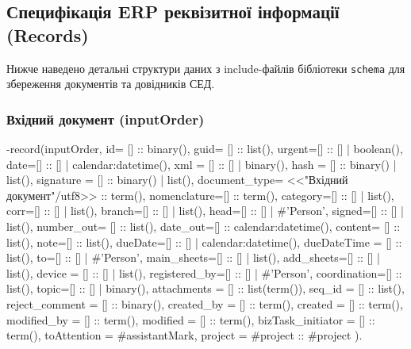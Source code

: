 \documentclass{article}
\let\originalfootnotesize\footnotesize
\let\oldverbatim\verbatim
\let\oldendverbatim\endverbatim
\renewenvironment{verbatim}{\originalfootnotesize\oldverbatim}{\oldendverbatim}
\begin{document}
\subsection{Специфікація ERP реквізитної інформації (Records)}

Нижче наведено детальні структури даних з include-файлів бібліотеки \texttt{schema} для збереження документів та довідників СЕД.

\subsubsection{Вхідний документ (inputOrder)}
\begin{verbatim}
-record(inputOrder, { id= [] :: binary(),
                      guid= [] :: list(),
                      urgent=[] :: [] | boolean(),
                      date=[] :: [] | calendar:datetime(),
                      xml = [] :: [] | binary(),
                      hash = [] :: binary() | list(),
                      signature = [] :: binary() | list(),
                      document_type= <<"Вхідний документ"/utf8>> :: term(),
                      nomenclature=[] :: term(),
                      category=[] :: [] | list(),
                      corr=[] :: [] | list(),
                      branch=[] :: [] | list(),
                      head=[] :: [] | #'Person'{},
                      signed=[] :: [] | list(),
                      number_out= [] :: list(),
                      date_out=[] :: calendar:datetime(),
                      content= [] :: list(),
                      note=[] :: list(),
                      dueDate=[] :: [] | calendar:datetime(),
                      dueDateTime = [] :: list(),
                      to=[] :: [] | #'Person'{},
                      main_sheets=[] :: [] | list(),
                      add_sheets=[] :: [] | list(),
                      device = [] :: [] | list(),
                      registered_by=[] :: [] | #'Person'{},
                      coordination=[] :: list(),
                      topic=[] :: [] | binary(),
                      attachments = [] :: list(term()),
                      seq_id = [] :: list(),
                      reject_comment = [] :: binary(),
                      created_by = [] :: term(),
                      created = [] :: term(),
                      modified_by = [] :: term(),
                      modified = [] :: term(),
                      bizTask_initiator = [] :: term(),
                      toAttention = #assistantMark{},
                      project = #project{} :: #project{}
 }).
\end{verbatim}
\end{document}
